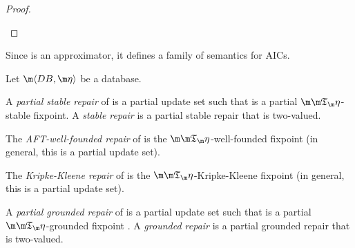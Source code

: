 \begin{proof}
{\begin{compactitem}
\end{compactitem}}

\end{proof}

Since \Ap is an approximator, it defines a family of semantics for AICs. 

\begin{definition}\label{def:semantics}
 Let $\fulldb$ be a database. 
 \begin{compactitem}
  \item A \emph{partial stable repair} of \fulldb is a partial update set \UUU such that \UUU is a partial $\Ap$-stable fixpoint. A \emph{stable repair} is a partial stable repair that is two-valued. 
  \item The \emph{AFT-well-founded repair} of \fulldb is the $\Ap$-well-founded fixpoint (in general, this is a partial update set). 
  \item The \emph{Kripke-Kleene repair} of \fulldb is the $\Ap$-Kripke-Kleene fixpoint (in general, this is a partial update set). 
  \item A \emph{partial grounded repair} of \fulldb is a partial update set \UUU such that \UUU is a partial $\Ap$-grounded fixpoint . A \emph{grounded repair} is a partial grounded repair that is two-valued. 
 \end{compactitem}
\end{definition}

